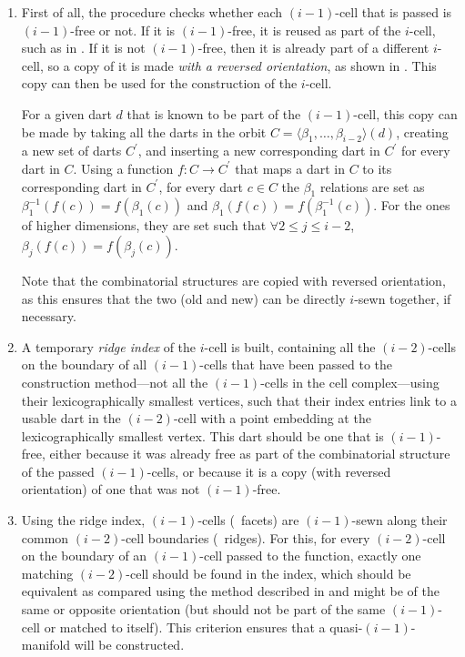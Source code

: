 \begin{enumerate}

\item
First of all, the procedure checks whether each $(i-1)$-cell that is passed is $(i-1)$-free or not.
If it is $(i-1)$-free, it is reused as part of the $i$-cell, such as in .
If it is not $(i-1)$-free, then it is already part of a different $i$-cell, so a copy of it is made \emph{with a reversed orientation}, as shown in .
This copy can then be used for the construction of the $i$-cell.

For a given dart $d$ that is known to be part of the $(i-1)$-cell, this copy can be made by taking all the darts in the orbit $C = \langle \beta_1, \ldots, \beta_{i-2} \rangle (d)$, creating a new set of darts $C^\prime$, and inserting a new corresponding dart in $C^\prime$ for every dart in $C$.
Using a function $f : C \rightarrow C^\prime$ that maps a dart in $C$ to its corresponding dart in $C^\prime$, for every dart $c \in C$ the $\beta_1$ relations are set as $\beta_1^{-1}\left(f\left(c\right)\right) = f\left(\beta_1\left(c\right)\right)$ and $\beta_1\left(f\left(c\right)\right) = f\left(\beta_1^{-1}\left(c\right)\right)$. For the ones of higher dimensions, they are set such that $\forall 2 \leq j \leq i-2$, $\beta_j\left(f\left(c\right)\right) = f\left(\beta_j\left(c\right)\right)$.

Note that the combinatorial structures are copied with reversed orientation, as this ensures that the two (old and new) can be directly $i$-sewn together, if necessary.

\item
A temporary \emph{ridge index} of the $i$-cell is built, containing all the $(i-2)$-cells on the boundary of all $(i-1)$-cells that have been passed to the construction method---not all the $(i-1)$-cells in the cell complex---using their lexicographically smallest vertices, such that their index entries link to a usable dart in the $(i-2)$-cell with a point embedding at the lexicographically smallest vertex.
This dart should be one that is $(i-1)$-free, either because it was already free as part of the combinatorial structure of the passed $(i-1)$-cells, or because it is a copy (with reversed orientation) of one that was not $(i-1)$-free.

\item
Using the ridge index, $(i-1)$-cells (\ie\ facets) are $(i-1)$-sewn along their common $(i-2)$-cell boundaries (\ie\ ridges).
For this, for every $(i-2)$-cell on the boundary of an $(i-1)$-cell passed to the function, exactly one matching $(i-2)$-cell should be found in the index, which should be equivalent as compared using the method described in  and might be of the same or opposite orientation (but should not be part of the same $(i-1)$-cell or matched to itself).
This criterion ensures that a quasi-$(i-1)$-manifold will be constructed.


\end{enumerate}
